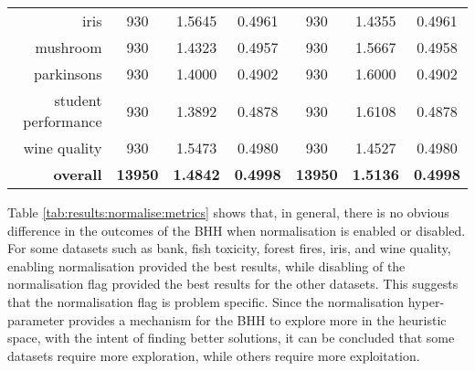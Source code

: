 \begin{table}[H]
{\begin{tabular}{rcccccc}
			iris                               & 930                                        & 1.5645                                                                             & 0.4961          & 930                               & \cellcolor[rgb]{ .776,  .937,  .808}\textcolor[rgb]{ 0,  .38,  0}{1.4355} & 0.4961          \\
			mushroom                           & 930                                        & \cellcolor[rgb]{ .776,  .937,  .808}\textcolor[rgb]{ 0,  .38,  0}{1.4323}          & 0.4957          & 930                               & 1.5667                                                                    & 0.4958          \\
			parkinsons                         & 930                                        & \cellcolor[rgb]{ .776,  .937,  .808}\textcolor[rgb]{ 0,  .38,  0}{1.4000}          & 0.4902          & 930                               & 1.6000                                                                    & 0.4902          \\
			student performance                & 930                                        & \cellcolor[rgb]{ .776,  .937,  .808}\textcolor[rgb]{ 0,  .38,  0}{1.3892}          & 0.4878          & 930                               & 1.6108                                                                    & 0.4878          \\
			wine quality                       & 930                                        & 1.5473                                                                             & 0.4980          & 930                               & \cellcolor[rgb]{ .776,  .937,  .808}\textcolor[rgb]{ 0,  .38,  0}{1.4527} & 0.4980          \\
			\midrule
			\textbf{overall}                   & \textbf{13950}                             & \cellcolor[rgb]{ .776,  .937,  .808}\textcolor[rgb]{ 0,  .38,  0}{\textbf{1.4842}} & \textbf{0.4998} & \textbf{13950}                    & \textbf{1.5136}                                                           & \textbf{0.4998} \\
		\end{tabular}%
	}
\end{table}%

Table \ref{tab:results:normalise:metrics} shows that, in general, there is no obvious difference in the outcomes of the \acs{BHH} when normalisation is enabled or disabled. For some datasets such as bank, fish toxicity, forest fires, iris, and wine quality, enabling normalisation provided the best results, while disabling of the normalisation flag provided the best results for the other datasets. This suggests that the normalisation flag is problem specific. Since the normalisation hyper-parameter provides a mechanism for the \acs{BHH} to explore more in the heuristic space, with the intent of finding better solutions, it can be concluded that some datasets require more exploration, while others require more exploitation.

